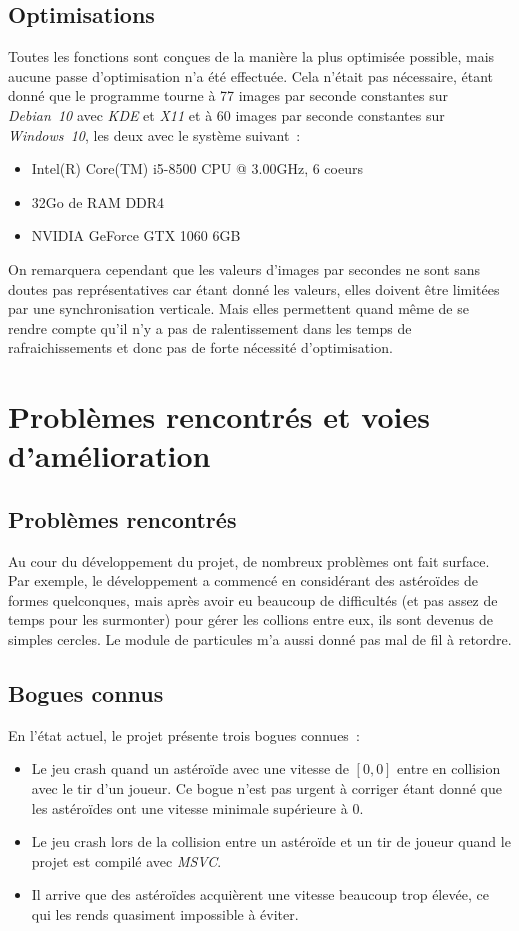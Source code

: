 \documentclass[10pt, french, a4paper]{report}
\begin{document}
\section{Optimisations}

Toutes les fonctions sont conçues de la manière la plus optimisée possible, mais
aucune passe d'optimisation n'a été effectuée. Cela n'était pas nécessaire, étant
donné que le programme tourne à 77 images par seconde constantes sur \textit{Debian~10} 
avec \textit{KDE} et \textit{X11} et à 60 images par seconde constantes sur 
\textit{Windows~10}, les deux avec le système suivant~:
\begin{itemize}
	\item Intel(R) Core(TM) i5-8500 CPU @  3.00GHz, 6 coeurs
	\item 32Go de RAM DDR4
	\item NVIDIA GeForce GTX 1060 6GB
\end{itemize}
On remarquera cependant que les valeurs d'images par secondes ne sont sans doutes pas représentatives car étant donné les valeurs, elles doivent être limitées par une 
synchronisation verticale. Mais elles permettent quand même de se rendre compte qu'il
n'y a pas de ralentissement dans les temps de rafraichissements et donc pas de forte
nécessité d'optimisation.

\chapter{Problèmes rencontrés et voies d'amélioration}

\section{Problèmes rencontrés}

Au cour du développement du projet, de nombreux problèmes ont fait surface. 
Par exemple, le développement a commencé en considérant des astéroïdes de 
formes quelconques, mais après avoir eu beaucoup de difficultés (et pas assez de 
temps pour les surmonter) pour gérer les collions entre eux, ils sont devenus de 
simples cercles.
Le module de particules m'a aussi donné pas mal de fil à retordre.

\section{Bogues connus}

En l'état actuel, le projet présente trois bogues connues~:
\begin{itemize}
	\item Le jeu \og crash \fg{} quand un astéroïde avec une vitesse de $[0, 0]$ entre en 
	      collision avec le tir d'un joueur. Ce bogue n'est pas urgent à corriger
	      étant donné que les astéroïdes ont une vitesse minimale supérieure à $0$.
	\item Le jeu \og crash \fg{} lors de la collision entre un astéroïde et un tir de
	      joueur quand le projet est compilé avec \textit{MSVC}.
	\item Il arrive que des astéroïdes acquièrent une vitesse beaucoup trop élevée, ce
	      qui les rends quasiment impossible à éviter.
\end{itemize}
\end{document}

